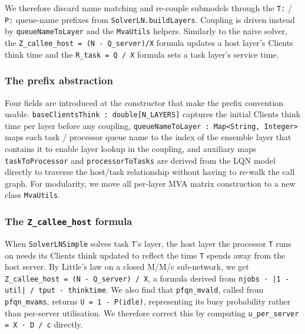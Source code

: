 We therefore discard name matching and re-couple submodels through the \texttt{T:} / \texttt{P:} queue-name prefixes from \texttt{SolverLN.buildLayers}. Coupling is driven instead by \texttt{queueNameToLayer} and the \texttt{MvaUtils} helpers. Similarly to the naive solver, the \texttt{Z\_callee\_host = (N - Q\_server)/X} formula updates a host layer's Clients think time and the \texttt{R\_task = Q / X} formula sets a task layer's service time.

\subsubsection*{The prefix abstraction}

Four fields are introduced at the constructor that make the prefix convention usable. \texttt{baseClientsThink : double[N\_LAYERS]} captures the initial Clients think time per layer before any coupling, \texttt{queueNameToLayer : Map<String, Integer>} maps each task / processor queue name to the index of the ensemble layer that contains it to enable layer lookup in the coupling, and auxiliary maps \texttt{taskToProcessor} and \texttt{processorToTasks} are derived from the LQN model directly to traverse the host/task relationship without having to re-walk the call graph. For modularity, we move all per-layer MVA matrix construction to a new class \texttt{MvaUtils}.

\subsubsection*{The \texttt{Z\_callee\_host} formula}

When \texttt{SolverLNSimple} solves task \texttt{T}'s layer, the host layer the processor \texttt{T} runs on needs its Clients think updated to reflect the time \texttt{T} spends away from the host server. By Little's law on a closed M/M/c sub-network, we get \texttt{Z\_callee\_host = (N - Q\_server) / X}, a formula derived from \texttt{njobs · |1 - util| / tput - thinktime}. We also find that \texttt{pfqn\_mvald}, called from \texttt{pfqn\_mvams}, returns \texttt{U = 1 - P(idle)}, representing its busy probability rather than per-server utilisation. We therefore correct this by computing \texttt{u\_per\_server = X · D / c} directly.


